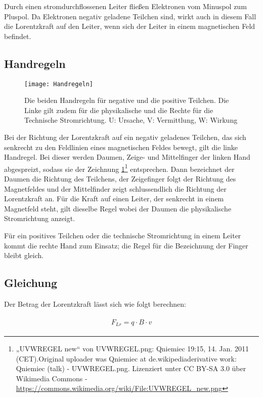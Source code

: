 Durch einen stromdurchflossenen Leiter fließen Elektronen vom Minuspol zum Pluspol. Da Elektronen negativ geladene Teilchen sind, wirkt auch in diesem Fall die Lorentzkraft auf den Leiter, wenn sich der Leiter in einem magnetischen Feld befindet.

\subsection{Handregeln}

\begin{figure}[h!]
	\centering
	\texttt{[image: Handregeln]}
	\caption{Die beiden Handregeln für negative und die positive Teilchen. Die Linke gilt zudem für die physikalische und die Rechte für die Technische Stromrichtung. U: Ursache, V: Vermittlung, W: Wirkung}
	\label{fig:Handregeln}
\end{figure}

Bei der Richtung der Lorentzkraft auf ein negativ geladenes Teilchen, das sich senkrecht zu den Feldlinien eines magnetischen Feldes bewegt, gilt die linke Handregel. Bei dieser werden Daumen, Zeige- und Mittelfinger der linken Hand abgespreizt, sodass sie der Zeichnung \ref{fig:Handregeln}\footnote{„UVWREGEL new“ von UVWREGEL.png: Qniemiec 19:15, 14. Jan. 2011 (CET).Original uploader was Qniemiec at de.wikipediaderivative work: Qniemiec (talk) - UVWREGEL.png. Lizenziert unter CC BY-SA 3.0 über Wikimedia Commons - \url{https://commons.wikimedia.org/wiki/File:UVWREGEL_new.png}} entsprechen. Dann bezeichnet der Daumen die Richtung des Teilchens, der Zeigefinger folgt der Richtung des Magnetfeldes und der Mittelfinder zeigt schlussendlich die Richtung der Lorentzkraft an. Für die Kraft auf einen Leiter, der senkrecht in einem Magnetfeld steht, gilt dieselbe Regel wobei der Daumen die physikalische Stromrichtung anzeigt.

Für ein positives Teilchen oder die technische Stromrichtung in einem Leiter kommt die rechte Hand zum Einsatz; die Regel für die Bezeichnung der Finger bleibt gleich.


\subsection{Gleichung} \label{subsec:BLorentzDefinition}

Der Betrag der Lorentzkraft lässt sich wie folgt berechnen:

\begin{align} \label{eq:Lorentzkraft}
\begin{split}
	F_{Lr} = q \cdot B \cdot v
\end{split}
\end{align}


